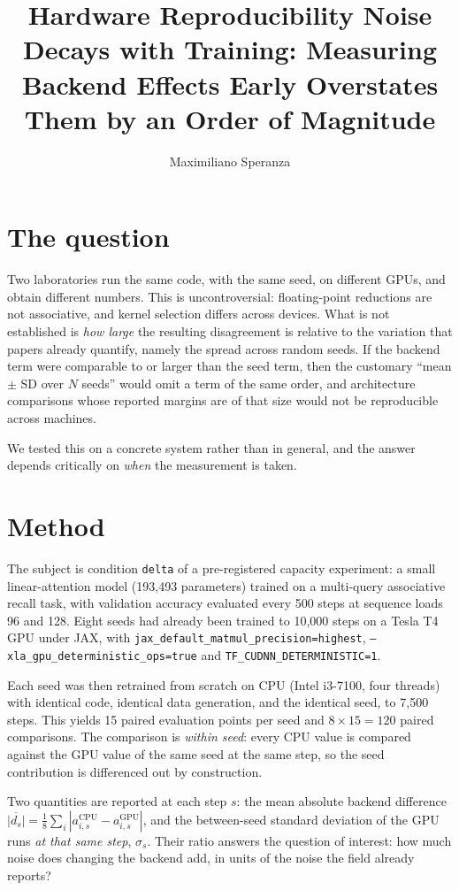 \documentclass[jou,11pt,donotrepeattitle]{apa7}
\title{Hardware Reproducibility Noise Decays with Training: Measuring Backend
Effects Early Overstates Them by an Order of Magnitude}
\author{Maximiliano Speranza}
\affiliation{Independent Researcher, Argentina}
\begin{document}
\maketitle

\section{The question}

Two laboratories run the same code, with the same seed, on different GPUs, and obtain different
numbers. This is uncontroversial: floating-point reductions are not associative, and kernel
selection differs across devices. What is not established is \emph{how large} the resulting
disagreement is relative to the variation that papers already quantify, namely the spread across
random seeds. If the backend term were comparable to or larger than the seed term, then the
customary ``mean $\pm$ SD over $N$ seeds'' would omit a term of the same order, and architecture
comparisons whose reported margins are of that size would not be reproducible across machines.

We tested this on a concrete system rather than in general, and the answer depends critically on
\emph{when} the measurement is taken.

\section{Method}

The subject is condition \texttt{delta} of a pre-registered capacity experiment: a small
linear-attention model (193{,}493 parameters) trained on a multi-query associative recall task,
with validation accuracy evaluated every 500 steps at sequence loads 96 and 128. Eight seeds had
already been trained to 10{,}000 steps on a Tesla T4 GPU under JAX, with
\texttt{jax\_default\_matmul\_precision=highest}, \texttt{--xla\_gpu\_deterministic\_ops=true}
and \texttt{TF\_CUDNN\_DETERMINISTIC=1}.

Each seed was then retrained from scratch on CPU (Intel i3-7100, four threads) with identical
code, identical data generation, and the identical seed, to 7{,}500 steps. This yields 15 paired
evaluation points per seed and $8 \times 15 = 120$ paired comparisons. The comparison is
\emph{within seed}: every CPU value is compared against the GPU value of the same seed at the
same step, so the seed contribution is differenced out by construction.

Two quantities are reported at each step $s$: the mean absolute backend difference
$\overline{|d_s|} = \frac{1}{8}\sum_i |a^{\text{CPU}}_{i,s} - a^{\text{GPU}}_{i,s}|$, and the
between-seed standard deviation of the GPU runs \emph{at that same step}, $\sigma_s$. Their ratio
answers the question of interest: how much noise does changing the backend add, in units of the
noise the field already reports?
\end{document}
